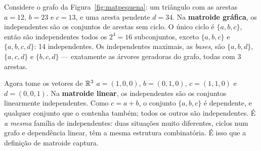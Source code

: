 \begin{exemplo}\label{ex:matpequena}
Considere o grafo da Figura~\ref{fig:matpequena}: um triângulo com as arestas $a=12$, $b=23$ e $c=13$, e uma aresta pendente $d=34$. Na \textbf{matroide gráfica}, os independentes são os conjuntos de arestas sem ciclo. O único ciclo é $\{a,b,c\}$, então são independentes todos os $2^4=16$ subconjuntos, exceto $\{a,b,c\}$ e $\{a,b,c,d\}$: 14 independentes. Os independentes maximais, as \emph{bases}, são $\{a,b,d\}$, $\{a,c,d\}$ e $\{b,c,d\}$ --- exatamente as árvores geradoras do grafo, todas com 3 arestas.

Agora tome os vetores de $\mathbb{R}^3$ $a=(1,0,0)$, $b=(0,1,0)$, $c=(1,1,0)$ e $d=(0,0,1)$. Na \textbf{matroide linear}, os independentes são os conjuntos linearmente independentes. Como $c=a+b$, o conjunto $\{a,b,c\}$ é dependente, e qualquer conjunto que o contenha também; todos os outros são independentes. É \emph{a mesma} família de independentes: duas situações muito diferentes, ciclos num grafo e dependência linear, têm a mesma estrutura combinatória. É isso que a definição de matroide captura.
\begin{figura}
\hspace{1cm}
\hspace{5mm}
\begin{tikzpicture}[x=1cm,y=1cm, baseline={(0,0.5)}]

\end{tikzpicture}
\end{figura}
\end{exemplo}
